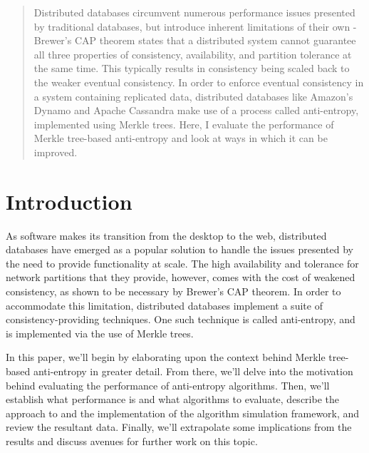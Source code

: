 \documentclass[11pt,letterpaper]{article}
\begin{document}
\maketitle

\newpage 

\begin{abstract}
Distributed databases circumvent numerous performance issues presented by traditional databases, but introduce inherent limitations of their own - Brewer's CAP theorem states that a distributed system cannot guarantee all three properties of consistency, availability, and partition tolerance at the same time. This typically results in consistency being scaled back to the weaker eventual consistency. In order to enforce eventual consistency in a system containing replicated data, distributed databases like Amazon's Dynamo and Apache Cassandra make use of a process called anti-entropy, implemented using Merkle trees. Here, I evaluate the performance of Merkle tree-based anti-entropy and look at ways in which it can be improved.
\end{abstract}

\newpage 

\tableofcontents

\newpage 

\section{Introduction}
As software makes its transition from the desktop to the web, distributed databases have emerged as a popular solution to handle the issues presented by the need to provide functionality at scale. The high availability and tolerance for network partitions that they provide, however, comes with the cost of weakened consistency, as shown to be necessary by Brewer's CAP theorem\cite{Brewer:2000:TRD:343477.343502}. In order to accommodate this limitation, distributed databases implement a suite of consistency-providing techniques. One such technique is called anti-entropy, and is implemented via the use of Merkle trees\cite{Merkle:1987:DSB:646752.704751}.

In this paper, we'll begin by elaborating upon the context behind Merkle tree-based anti-entropy in greater detail. From there, we'll delve into the motivation behind evaluating the performance of anti-entropy algorithms. Then, we'll establish what performance is and what algorithms to evaluate, describe the approach to and the implementation of the algorithm simulation framework, and review the resultant data. Finally, we'll extrapolate some implications from the results and discuss avenues for further work on this topic.
\end{document}

